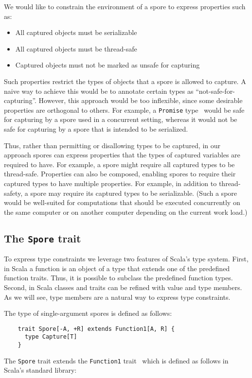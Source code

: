 \documentclass{llncs}
\begin{document}
We would like to constrain the environment of a spore to express properties
such as:
\begin{itemize}
\item All captured objects must be serializable
\item All captured objects must be thread-safe
\item Captured objects must not be marked as unsafe for capturing
\end{itemize}
\noindent
Such properties restrict the types of objects that a spore is allowed to
capture. A naive way to achieve this would be to annotate certain types as
``not-safe-for-capturing''. However, this approach would be too inflexible,
since some desirable properties are orthogonal to others. For example, a
\verb|Promise| type~\cite{promise-paper} would be safe for capturing by a
spore used in a concurrent setting, whereas it would not be safe for capturing
by a spore that is intended to be serialized.

Thus, rather than permitting or disallowing types to be captured, in our
approach spores can express properties that the types of captured variables
are required to have. For example, a spore might require all captured types to
be thread-safe. Properties can also be composed, enabling spores to require
their captured types to have multiple properties. For example, in addition to
thread-safety, a spore may require its captured types to be serializable.
(Such a spore would be well-suited for computations that should be executed
concurrently on the same computer or on another computer depending on the
current work load.)

\subsection{The \texttt{Spore} trait}

To express type constraints we leverage two features of Scala's type system.
First, in Scala a function is an object of a type that extends one of the
predefined function traits. Thus, it is possible to subclass the predefined
function types. Second, in Scala classes and traits can be refined with value
and type members. As we will see, type members are a natural way to express
type constraints.

The type of single-argument spores is defined as follows:

\begin{lstlisting}
    trait Spore[-A, +R] extends Function1[A, R] {
      type Capture[T]
    }
\end{lstlisting}
\noindent
The \verb|Spore| trait extends the \verb|Function1| trait~ which is defined as
follows in Scala's standard library:
\end{document}
